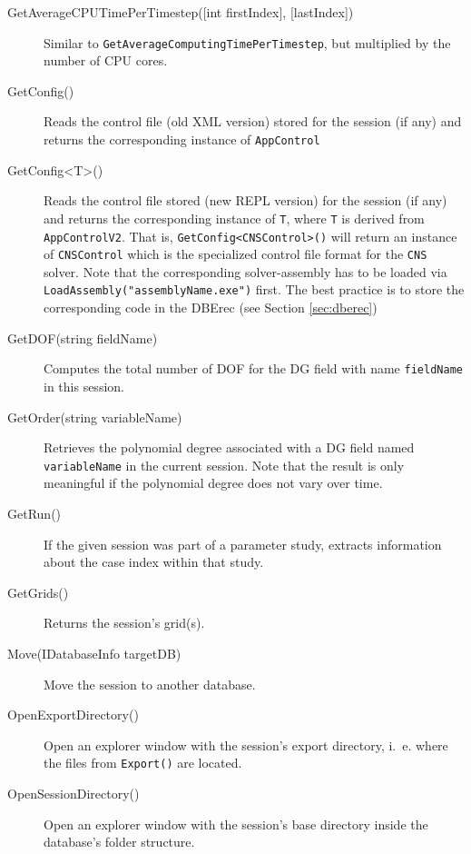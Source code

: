 \begin{description}
	\item[GetAverageCPUTimePerTimestep({[}int firstIndex{]}, {[}lastIndex{]})]
	Similar to \lstinline{GetAverageComputingTimePerTimestep}, but multiplied by the number of CPU cores.
	
	\item[GetConfig()]
	Reads the control file (old XML version) stored for the session (if any) and returns the corresponding instance of \lstinline{AppControl}
	
	\item[GetConfig<T>()]
	Reads the control file stored (new REPL version) for the session (if any) and returns the corresponding instance of \lstinline{T}, where \lstinline{T} is derived from \lstinline{AppControlV2}. That is, \lstinline{GetConfig<CNSControl>()} will return an instance of \lstinline{CNSControl} which is the specialized control file format for the \lstinline{CNS} solver. Note that the corresponding solver-assembly has to be loaded via \lstinline{LoadAssembly("assemblyName.exe")} first. The best practice is to store the corresponding code in the DBErec (see Section \ref{sec:dberec})
	
	\item[GetDOF(string fieldName)]
	Computes the total number of DOF for the DG field with name \lstinline{fieldName} in this session.
	
	\item[GetOrder(string variableName)]
	Retrieves the polynomial degree associated with a DG field named \lstinline{variableName} in the current session. Note that the result is only meaningful if the polynomial degree does not vary over time.
	
	\item[GetRun()]
	If the given session was part of a parameter study, extracts information about the case index within that study.
	
	\item[GetGrids()]
	Returns the session's grid(s).
	
	\item[Move(IDatabaseInfo targetDB)]
	Move the session to another database.
	
	\item[OpenExportDirectory()]
	Open an explorer window with the session's export directory, i.~e. where the files from \lstinline{Export()} are located.
	
	\item[OpenSessionDirectory()]
	Open an explorer window with the session's base directory inside the database's folder structure.
	

\end{description}
